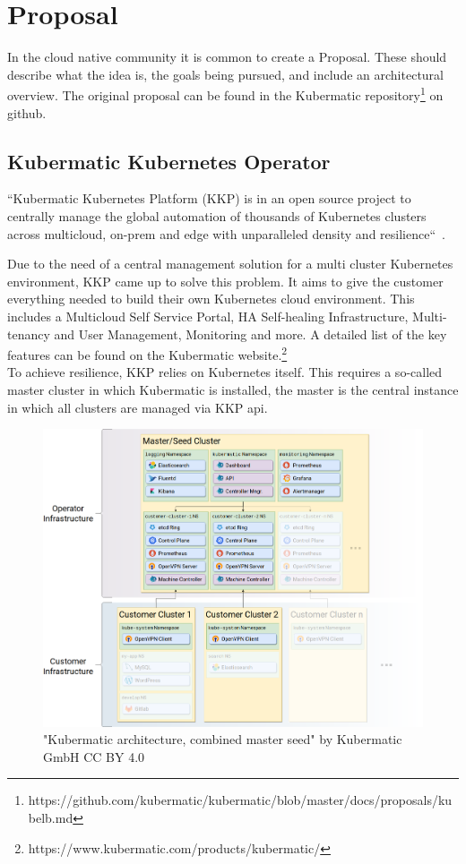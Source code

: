 \chapter{Proposal}

In the cloud native community it is common to create a Proposal.
These should describe what the idea is, the goals being pursued, and include an architectural overview.
The original proposal can be found in the Kubermatic repository\footnote{https://github.com/kubermatic/kubermatic/blob/master/docs/proposals/kubelb.md} on github.

\section{Kubermatic Kubernetes Operator}

``Kubermatic Kubernetes Platform (KKP) is in an open source project to centrally manage the global automation of thousands of Kubernetes clusters across multicloud, on-prem and edge with unparalleled density and resilience``~\cite{KKP-GITHUB}.

Due to the need of a central management solution for a multi cluster Kubernetes environment, KKP came up to solve this problem.
It aims to give the customer everything needed to build their own Kubernetes cloud environment. 
This includes a Multicloud Self Service Portal, HA Self-healing Infrastructure, Multi-tenancy and User Management, Monitoring and more.
A detailed list of the key features can be found on the Kubermatic website.\footnote{https://www.kubermatic.com/products/kubermatic/}
\\
To achieve resilience, KKP relies on Kubernetes itself.
This requires a so-called master cluster in which Kubermatic is installed, the master is the central instance in which all clusters are managed via KKP api.

\begin{figure}[H]
    \centering
    \includegraphics[width=1\textwidth, left]{media/05/kkp}
    \caption{"Kubermatic architecture, combined master seed" by Kubermatic GmbH CC BY 4.0}
    \label{fig:kubermatic}
\end{figure}

